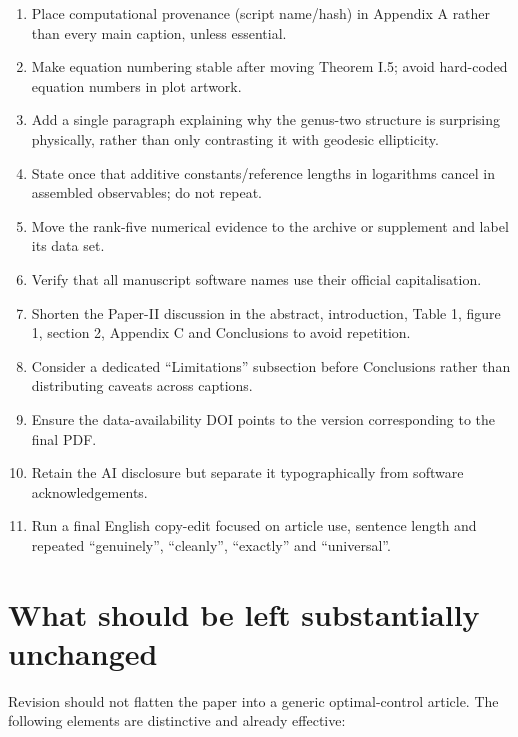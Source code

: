 \documentclass[11pt,a4paper]{article}
\begin{document}
\begin{enumerate}[label=\textbf{m\arabic*.}]
  limitations.
  \item Place computational provenance (script name/hash) in Appendix A rather than every main
  caption, unless essential.
  \item Make equation numbering stable after moving Theorem I.5; avoid hard-coded equation numbers
  in plot artwork.
  \item Add a single paragraph explaining why the genus-two structure is surprising physically,
  rather than only contrasting it with geodesic ellipticity.
  \item State once that additive constants/reference lengths in logarithms cancel in assembled
  observables; do not repeat.
  \item Move the rank-five numerical evidence to the archive or supplement and label its data set.
  \item Verify that all manuscript software names use their official capitalisation.
  \item Shorten the Paper-II discussion in the abstract, introduction, Table 1, figure 1, section 2,
  Appendix C and Conclusions to avoid repetition.
  \item Consider a dedicated ``Limitations'' subsection before Conclusions rather than distributing
  caveats across captions.
  \item Ensure the data-availability DOI points to the version corresponding to the final PDF.
  \item Retain the AI disclosure but separate it typographically from software acknowledgements.
  \item Run a final English copy-edit focused on article use, sentence length and repeated
  ``genuinely'', ``cleanly'', ``exactly'' and ``universal''.
\end{enumerate}

\section{What should be left substantially unchanged}

Revision should not flatten the paper into a generic optimal-control article.  The following
elements are distinctive and already effective:
\end{document}
